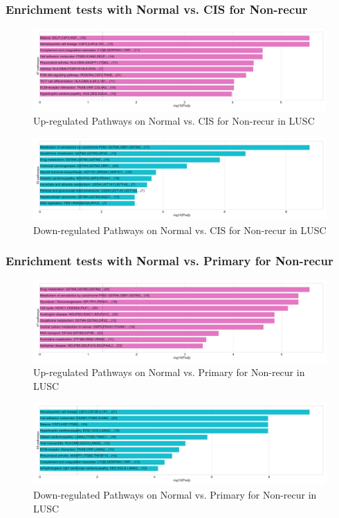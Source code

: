 \documentclass{beamer}
\begin{document}
    \begin{frame}
        \frametitle{Enrichment tests with Normal vs. CIS for Non-recur}

        \begin{figure}
            \includegraphics[width=0.8 \linewidth]{figures/DEG/Enrichment/STAR.FPKM.SQC.Nonrecur.Normal-CIS.Up.KEGG.pdf}
            \caption{Up-regulated Pathways on Normal vs. CIS for Non-recur in LUSC}
        \end{figure}

        \begin{figure}
            \includegraphics[width=0.8 \linewidth]{figures/DEG/Enrichment/STAR.FPKM.SQC.Nonrecur.Normal-CIS.Down.KEGG.pdf}
            \caption{Down-regulated Pathways on Normal vs. CIS for Non-recur in LUSC}
        \end{figure}
    \end{frame}

    \begin{frame}
        \frametitle{Enrichment tests with Normal vs. Primary for Non-recur}

        \begin{figure}
            \includegraphics[width=0.8 \linewidth]{figures/DEG/Enrichment/STAR.FPKM.SQC.Nonrecur.Normal-Primary.Up.KEGG.pdf}
            \caption{Up-regulated Pathways on Normal vs. Primary for Non-recur in LUSC}
        \end{figure}

        \begin{figure}
            \includegraphics[width=0.8 \linewidth]{figures/DEG/Enrichment/STAR.FPKM.SQC.Nonrecur.Normal-Primary.Down.KEGG.pdf}
            \caption{Down-regulated Pathways on Normal vs. Primary for Non-recur in LUSC}
        \end{figure}
    \end{frame}
\end{document}
